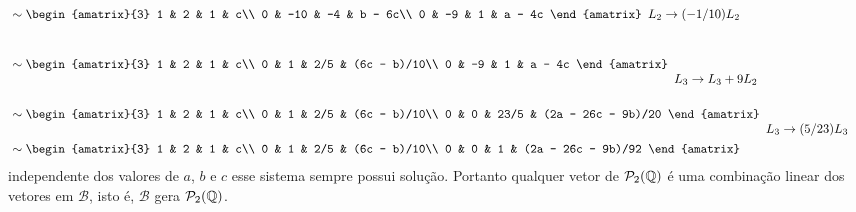 \begin{exemplos}
\begin{enumerate}
\begin{solucao}
\begin{align}
\begin{array}{l}
          \end{array}\\\nonumber&\sim
          \begin{amatrix}{3}
            1 & 2 & 1 & c\\
            0 & -10 & -4 & b - 6c\\
            0 & -9 & 1 & a - 4c
          \end{amatrix}
          \begin{array}{l}
            \phantom{x}\\L_2 \to (-1/10)L_2\\\phantom{x}
          \end{array}\\\nonumber&\sim
          \begin{amatrix}{3}
            1 & 2 & 1 & c\\
            0 & 1 & 2/5 & (6c - b)/10\\
            0 & -9 & 1 & a - 4c
          \end{amatrix}
          \begin{array}{l}
            \phantom{x}\\\phantom{x}\\L_3 \to L_3 + 9L_2
          \end{array}\\\nonumber&\sim
          \begin{amatrix}{3}
            1 & 2 & 1 & c\\
            0 & 1 & 2/5 & (6c - b)/10\\
            0 & 0 & 23/5 & (2a - 26c - 9b)/20
          \end{amatrix}
          \begin{array}{l}
            \phantom{x}\\\phantom{x}\\L_3 \to (5/23)L_3
          \end{array}\\&\sim
          \begin{amatrix}{3}
            1 & 2 & 1 & c\\
            0 & 1 & 2/5 & (6c - b)/10\\
            0 & 0 & 1 & (2a - 26c - 9b)/92
          \end{amatrix}
        \end{align}
        independente dos valores de $a$, $b$ e $c$ esse sistema sempre possui solução. Portanto qualquer vetor de $\mathcal{P}_2(\mathbb{Q})$ é uma combinação linear dos vetores em $\mathcal{B}$, isto é, $\mathcal{B}$ gera $\mathcal{P}_2(\mathbb{Q})$.


\end{solucao}
\end{enumerate}
\end{exemplos}
